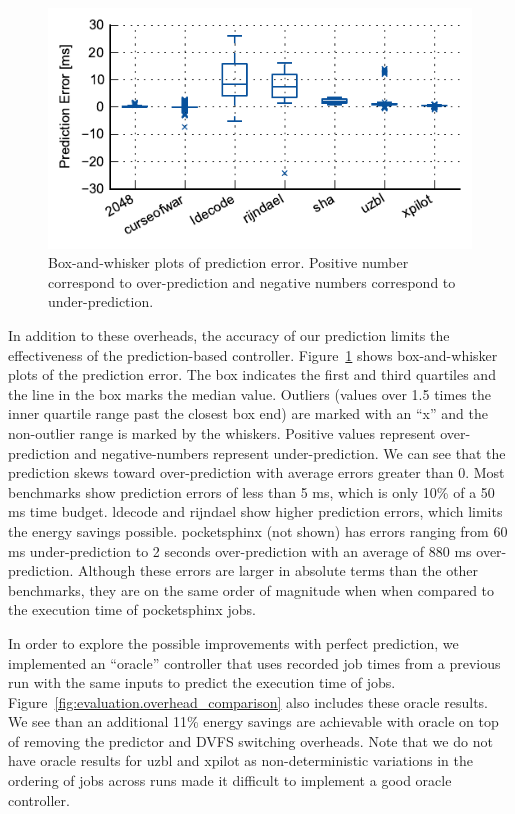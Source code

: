 \begin{figure}
  \begin{center}
    \includegraphics{exec_time_prediction/data/prediction_error.pdf}
    \caption{Box-and-whisker plots of prediction error. Positive number
    correspond to over-prediction and negative numbers correspond to
    under-prediction.}
    \label{fig:evaluation.prediction_error}
  \end{center}
\end{figure}

In addition to these overheads, the accuracy of our prediction limits the
effectiveness of the prediction-based controller. 
Figure~\ref{fig:evaluation.prediction_error} shows box-and-whisker plots of the prediction error.
The box indicates the first and third quartiles and the line in the box marks
the median value. Outliers (values over 1.5 times the inner quartile range past
the closest box end) are marked with an ``x'' and the non-outlier range is
marked by the whiskers.
Positive values represent over-prediction and
negative-numbers represent under-prediction. We can see that the prediction
skews toward over-prediction with average errors greater than 0.
Most benchmarks show prediction errors of less than 5 ms, which is only 10\% of
a 50 ms time budget. ldecode and rijndael show higher prediction errors, which
limits the energy savings possible. pocketsphinx (not shown) has errors ranging
from 60 ms under-prediction to 2 seconds over-prediction with an average of 880
ms over-prediction. Although these errors are larger in
absolute terms than the other benchmarks, they are on the same order of
magnitude when when compared to the execution time of pocketsphinx jobs.

In order to explore the possible improvements with perfect prediction, 
we implemented an ``oracle'' controller that uses recorded job times from a previous
run with the same inputs to predict the execution time of jobs.
Figure~\ref{fig:evaluation.overhead_comparison} also includes these oracle
results. We see than an additional 11\% energy savings are achievable with
oracle on top of removing the predictor and DVFS switching overheads. Note that
we do not have oracle results for uzbl and xpilot as non-deterministic
variations in the ordering of jobs across runs made it difficult to implement a
good oracle controller.

